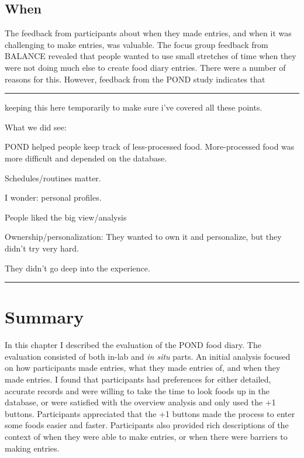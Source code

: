 \subsection{When}
The feedback from participants about when they made entries, and when it was challenging to make entries, was valuable. The focus group feedback from BALANCE revealed that people wanted to use small stretches of time when they were not doing much else to create food diary entries. There were a number of reasons for this. However, feedback from the POND study indicates that 

\vspace{1cm}
\hrule
keeping this here temporarily to make sure i've covered all these points. 

What we did see: 
\begin{itemize*}
\item POND helped people keep track of less-processed food. More-processed food was more difficult and depended on the database. 
\item Schedules/routines matter. 
\item I wonder: personal profiles. 
\item People liked the big view/analysis
\item Ownership/personalization: They wanted to own it and personalize, but they didn't try very hard. 
\item They didn't go deep into the experience. 
\end{itemize*}
\hrule
\vspace{1cm}

\section{Summary}
In this chapter I described the evaluation of the POND food diary. The evaluation consisted of both in-lab and \textit{in situ} parts. An initial analysis focused on how participants made entries, what they made entries of, and when they made entries. I found that participants had preferences for either detailed, accurate records and were willing to take the time to look foods up in the database, or were satisfied with the overview analysis and only used the +1 buttons. Participants appreciated that the +1 buttons made the process to enter some foods easier and faster. Participants also provided rich descriptions of the context of when they were able to make entries, or when there were barriers to making entries. 

